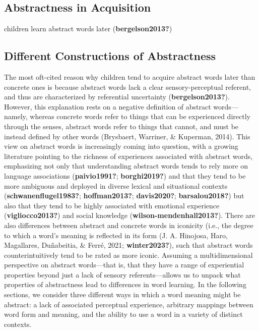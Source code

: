 \documentclass[
  man,floatsintext]{apa6}
\begin{document}
\hypertarget{abstractness-in-acquisition}{%
\subsection{Abstractness in Acquisition}\label{abstractness-in-acquisition}}

children learn abstract words later (\textbf{bergelson2013?})

\hypertarget{different-constructions-of-abstractness}{%
\subsection{Different Constructions of Abstractness}\label{different-constructions-of-abstractness}}

The most oft-cited reason why children tend to acquire abstract words later than concrete ones is because abstract words lack a clear sensory-perceptual referent, and thus are characterized by referential uncertainty (\textbf{bergelson2013?}). However, this explanation rests on a negative definition of abstract words---namely, whereas concrete words refer to things that can be experienced directly through the senses, abstract words refer to things that cannot, and must be instead defined by other words (Brysbaert, Warriner, \& Kuperman, 2014). This view on abstract words is increasingly coming into question, with a growing literature pointing to the richness of experiences associated with abstract words, emphasizing not only that understanding abstract words tends to rely more on language associations (\textbf{paivio1991?}; \textbf{borghi2019?}) and that they tend to be more ambiguous and deployed in diverse lexical and situational contexts (\textbf{schwanenflugel1983?}; \textbf{hoffman2013?}; \textbf{davis2020?}; \textbf{barsalou2018?}) but also that they tend to be highly associated with emotional experience (\textbf{vigliocco2013?}) and social knowledge (\textbf{wilson-mendenhall2013?}). There are also differences between abstract and concrete words in iconicity (i.e., the degree to which a word's meaning is reflected in its form (J. A. Hinojosa, Haro, Magallares, Duñabeitia, \& Ferré, 2021; \textbf{winter2023?}), such that abstract words counterintuitively tend to be rated as more iconic. Assuming a multidimensional perspective on abstract words---that is, that they have a range of experiential properties beyond just a lack of sensory referents---allows us to unpack what properties of abstractness lead to differences in word learning. In the following sections, we consider three different ways in which a word meaning might be abstract: a lack of associated perceptual experience, arbitrary mappings between word form and meaning, and the ability to use a word in a variety of distinct contexts.
\end{document}
